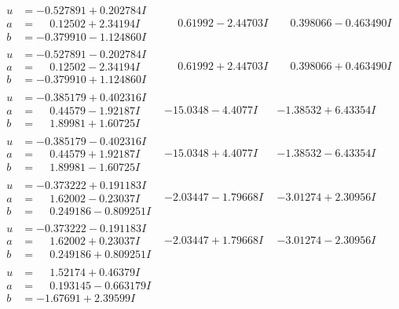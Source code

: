 \documentclass[1p]{elsarticle_modified}
\theoremstyle{definition}
\begin{document}
$$\begin{array}{c|c|c}
\begin{aligned}
u &= -0.527891 + 0.202784 I \\
a &= \phantom{-}0.12502 + 2.34194 I \\
b &= -0.379910 - 1.124860 I\end{aligned}
 & \phantom{-}0.61992 - 2.44703 I & \phantom{-}0.398066 - 0.463490 I \\ \hline\begin{aligned}
u &= -0.527891 - 0.202784 I \\
a &= \phantom{-}0.12502 - 2.34194 I \\
b &= -0.379910 + 1.124860 I\end{aligned}
 & \phantom{-}0.61992 + 2.44703 I & \phantom{-}0.398066 + 0.463490 I \\ \hline\begin{aligned}
u &= -0.385179 + 0.402316 I \\
a &= \phantom{-}0.44579 - 1.92187 I \\
b &= \phantom{-}1.89981 + 1.60725 I\end{aligned}
 & -15.0348 - 4.4077 I & -1.38532 + 6.43354 I \\ \hline\begin{aligned}
u &= -0.385179 - 0.402316 I \\
a &= \phantom{-}0.44579 + 1.92187 I \\
b &= \phantom{-}1.89981 - 1.60725 I\end{aligned}
 & -15.0348 + 4.4077 I & -1.38532 - 6.43354 I \\ \hline\begin{aligned}
u &= -0.373222 + 0.191183 I \\
a &= \phantom{-}1.62002 - 0.23037 I \\
b &= \phantom{-}0.249186 - 0.809251 I\end{aligned}
 & -2.03447 - 1.79668 I & -3.01274 + 2.30956 I \\ \hline\begin{aligned}
u &= -0.373222 - 0.191183 I \\
a &= \phantom{-}1.62002 + 0.23037 I \\
b &= \phantom{-}0.249186 + 0.809251 I\end{aligned}
 & -2.03447 + 1.79668 I & -3.01274 - 2.30956 I \\ \hline\begin{aligned}
u &= \phantom{-}1.52174 + 0.46379 I \\
a &= \phantom{-}0.193145 - 0.663179 I \\
b &= -1.67691 + 2.39599 I\end{aligned}

\end{array}$$
\end{document}
